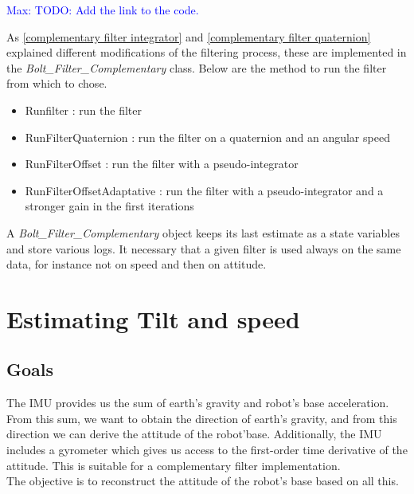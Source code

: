 \documentclass[a4paper,10pt]{article}
\newcommand{\mnaveau}[1]{\textcolor{blue}{Max: #1}}
\begin{document}
\mnaveau{TODO: Add the link to the code.}

As \ref{complementary filter integrator} and \ref{complementary filter quaternion} explained different modifications of the filtering process, these are implemented in the \textit{Bolt\_Filter\_Complementary} class. Below are the method to run the filter from which to chose.

\begin{itemize}
	\item Runfilter : run the filter
	\item RunFilterQuaternion : run the filter on a quaternion and an angular speed
	\item RunFilterOffset : run the filter with a pseudo-integrator
	\item RunFilterOffsetAdaptative : run the filter with a pseudo-integrator and a stronger gain in the first iterations
\end{itemize}

A \textit{Bolt\_Filter\_Complementary} object keeps its last estimate as a state variables and store various logs. It necessary that a given filter is used always on the same data, for instance not on speed and then on attitude. 


\section{Estimating Tilt and speed}
\label{estimating tilt and speed}

\subsection{Goals}
The IMU provides us the sum of earth's gravity and robot's base acceleration. From this sum, we want to obtain the direction of earth's gravity, and from this direction we can derive the attitude of the robot'base. Additionally, the IMU includes a gyrometer which gives us access to the first-order time derivative of the attitude. This is suitable for a complementary filter implementation.\\
The objective is to reconstruct the attitude of the robot's base based on all this. 
\end{document}
